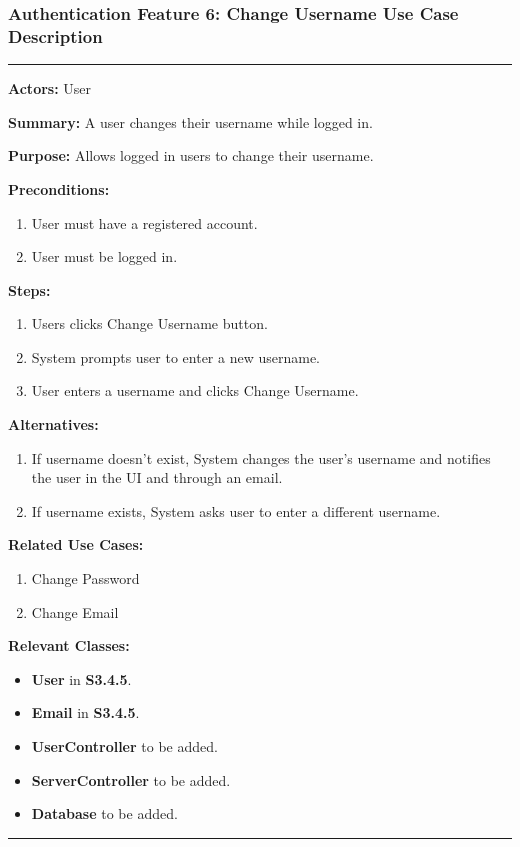 \documentclass[twoside,letterpaper]{article}
\begin{document}
	
	\subsubsection[Authentication Feature 6: Change Username Use Case Description] {\rmfamily\bfseries\color{black}
		Authentication Feature 6: Change Username Use Case Description}
		\label{a:uc6}
	\hypertarget{RefHeading22059017292}{}
	
	\hrule
	\vspace{8pt}
	\noindent\textbf{Actors:} User \newline
	
	\noindent\textbf{Summary:} A user changes their username while logged in.  \newline
	
	\noindent\textbf{Purpose:} Allows logged in users to change their username.  \newline
	
	\noindent\textbf{Preconditions:}
	\begin{enumerate}
		\item User must have a registered account.
		\item User must be logged in.
	\end{enumerate}
	
	\noindent\textbf{Steps:}
	\begin{enumerate}
		\item Users clicks Change Username button.
		\item System prompts user to enter a new username.
		\item User enters a username and clicks Change Username.
	\end{enumerate}
	
	\noindent\textbf{Alternatives:}
	\begin{enumerate}
		\item If username doesn't exist, System changes the user's username and notifies the user in the UI and through an email.
		\item If username exists, System asks user to enter a different username.
	\end{enumerate}
	
	\noindent\textbf{Related Use Cases:}
	\begin{enumerate}
		\item Change Password
		\item Change Email
	\end{enumerate}
	
	\noindent\textbf{Relevant Classes:}
	\begin{itemize}
		\item \textbf{User} in \textbf{S3.4.5}.
		\item \textbf{Email} in \textbf{S3.4.5}.
		\item \textbf{UserController} to be added.
		\item \textbf{ServerController} to be added.
		\item \textbf{Database} to be added.
	\end{itemize}
	\vspace{8pt}
	\hrule
	\newpage
	
\end{document}

